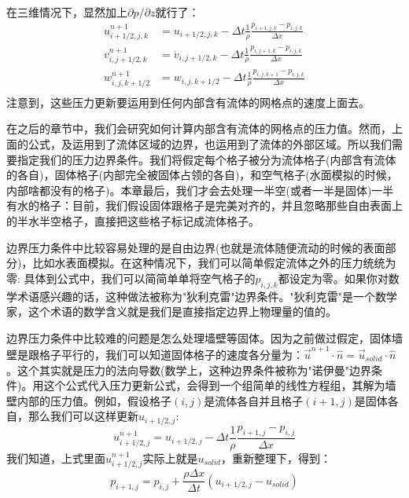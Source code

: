 \documentclass{article}
\begin{document}
在三维情况下，显然加上$\partial{p}/\partial{z}$就行了：
\begin{equation}
\begin{aligned}
u_{i+1/2,j,k}^{n+1}&=u_{i+1/2,j,k}-\Delta{t}\frac{1}{\rho}\frac{p_{i+1,j,k}-p_{i,j,k}}{\Delta{x}} \\
v_{i,j+1/2,k}^{n+1}&=v_{i,j+1/2,k}-\Delta{t}\frac{1}{\rho}\frac{p_{i,j+1,k}-p_{i,j,k}}{\Delta{x}} \\
w_{i,j,k+1/2}^{n+1}&=w_{i,j,k+1/2}-\Delta{t}\frac{1}{\rho}\frac{p_{i,j,k+1}-p_{i,j,k}}{\Delta{x}} \\ \label{3d_pressure_velocity_update}
\end{aligned}
\end{equation}
注意到，这些压力更新要运用到任何内部含有流体的网格点的速度上面去。
\par
在之后的章节中，我们会研究如何计算内部含有流体的网格点的压力值。然而，上面的公式，及运用到了流体区域的边界，也运用到了流体的外部区域。所以我们需要指定我们的压力边界条件。我们将假定每个格子被分为流体格子(内部含有流体的各自)，固体格子(内部完全被固体占领的各自)，和空气格子(水面模拟的时候，内部啥都没有的格子)。本章最后，我们才会去处理一半空(或者一半是固体)一半有水的格子：目前，我们假设固体跟格子是完美对齐的，并且忽略那些自由表面上的半水半空格子，直接把这些格子标记成流体格子。
\par
边界压力条件中比较容易处理的是自由边界(也就是流体随便流动的时候的表面部分)，比如水表面模拟。在这种情况下，我们可以简单假定流体之外的压力统统为零: 具体到公式中，我们可以简简单单将空气格子的$p_{i,j,k}$都设定为零。如果你对数学术语感兴趣的话，这种做法被称为"狄利克雷"边界条件。"狄利克雷"是一个数学家，这个术语的数学含义就是我们是直接指定边界上物理量的值的。
\par
边界压力条件中比较难的问题是怎么处理墙壁等固体。因为之前做过假定，固体墙壁是跟格子平行的，我们可以知道固体格子的速度各分量为：$\vec{u}^{n+1}\cdot{\hat{n}}=\vec{u}_{solid}\cdot\hat{n}$。这个其实就是压力的法向导数(数学上，这种边界条件被称为"诺伊曼"边界条件)。用这个公式代入压力更新公式，会得到一个组简单的线性方程组，其解为墙壁内部的压力值。例如，假设格子$(i,j)$是流体各自并且格子$(i+1,j)$是固体各自，那么我们可以这样更新$u_{i+1/2,j}$:
\begin{equation}
u^{n+1}_{i+1/2,j}=u_{i+1/2,j}-\Delta{t}\frac{1}{\rho}\frac{p_{i+1,j}-p_{i,j}}{\Delta{x}}
\end{equation}
我们知道，上式里面$u^{n+1}_{i+1/2,j}$实际上就是$u_{solid}$，重新整理下，得到：
\begin{equation}
p_{i+1,j}=p_{i,j}+\frac{\rho\Delta{x}}{\Delta{t}}(u_{i+1/2,j}-u_{solid})  \label{solid_boundry_condition}
\end{equation}
\end{document}
